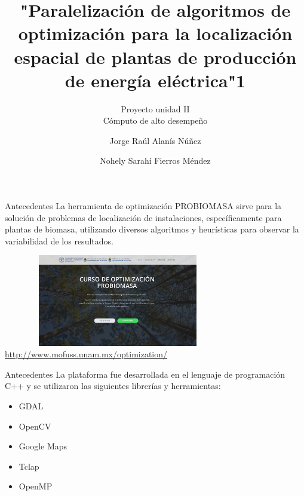 \documentclass[12pt]{beamer}
\author{Jorge Raúl Alanís Núñez \and Nohely Sarahí Fierros Méndez}
\title{"Paralelización de algoritmos de optimización para la localización espacial de plantas de producción de energía eléctrica"1}
\subtitle{{\normalsize Proyecto unidad II \\Cómputo de alto desempeño} }
\institute{Escuela Nacional de Estudios Superiores Unidad Morelia}
\begin{document}
\begin{frame}
\titlepage
\end{frame}


\begin{frame}{Antecedentes}
La herramienta de optimización PROBIOMASA sirve para la solución de problemas de localización de instalaciones, específicamente para plantas de biomasa, utilizando diversos algoritmos y heurísticas para observar la variabilidad de los resultados.\\

\begin{center}
\includegraphics[width=10.0cm,height=4cm]{webpage.png}
\footnotesize\url{http://www.mofuss.unam.mx/optimization/}
\end{center}

\end{frame}

\begin{frame}{Antecedentes}
La plataforma fue desarrollada en el lenguaje de programación C++ y se utilizaron las siguientes librerías y herramientas:
\begin{itemize}
\item GDAL
\item OpenCV
\item Google Maps
\item Tclap
\item OpenMP
\end{itemize} 
\end{frame}
\end{document}
